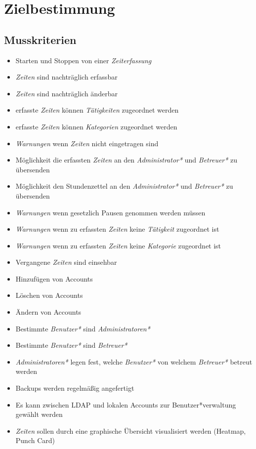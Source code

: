\section{Zielbestimmung}

\subsection{Musskriterien}

\begin{itemize}
	\item Starten und Stoppen von einer \emph{Zeiterfassung}
	\item \emph{Zeiten} sind nachträglich erfassbar
	\item \emph{Zeiten} sind nachträglich änderbar
	\item erfasste \emph{Zeiten} können \emph{Tätigkeiten} zugeordnet werden
	\item erfasste \emph{Zeiten} können \emph{Kategorien} zugeordnet werden
	\item \emph{Warnungen} wenn \emph{Zeiten} nicht eingetragen sind
	\item Möglichkeit die erfassten \emph{Zeiten} an den \emph{Administrator*} und \emph{Betreuer*} zu übersenden
	\item Möglichkeit den Stundenzettel an den \emph{Administrator*} und \emph{Betreuer*} zu übersenden
	\item \emph{Warnungen} wenn gesetzlich Pausen genommen werden müssen
	\item \emph{Warnungen} wenn zu erfassten \emph{Zeiten} keine \emph{Tätigkeit} zugeordnet ist
	\item \emph{Warnungen} wenn zu erfassten \emph{Zeiten} keine \emph{Kategorie} zugeordnet ist
	\item Vergangene \emph{Zeiten} sind einsehbar
	\item Hinzufügen von Accounts
	\item Löschen von Accounts
	\item Ändern von Accounts
	\item Bestimmte \emph{Benutzer*} sind \emph{Administratoren*}
	\item Bestimmte \emph{Benutzer*} sind \emph{Betreuer*}
	\item \emph{Administratoren*} legen fest, welche \emph{Benutzer*} von welchem \emph{Betreuer*} betreut werden
	\item Backups werden regelmäßig angefertigt
	\item Es kann zwischen LDAP und lokalen Accounts zur Benutzer*verwaltung gewählt werden
	\item \emph{Zeiten} sollen durch eine graphische Übersicht visualisiert werden (Heatmap, Punch Card)
\end{itemize}


